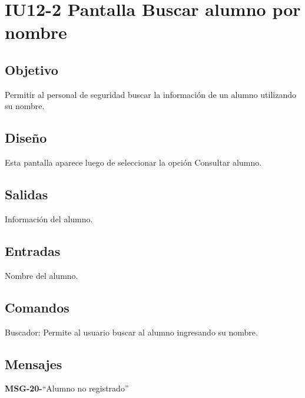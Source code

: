 \section{IU12-2 Pantalla Buscar alumno por nombre}

\subsection{Objetivo}
Permitir al personal de seguridad buscar la información de un alumno utilizando su nombre. 

\subsection{Diseño}
Esta pantalla  aparece luego de seleccionar la opción Consultar alumno. 


\subsection{Salidas}
Información del alumno.

\subsection{Entradas}
Nombre del alumno. 

\subsection{Comandos}
Buscador: Permite al usuario buscar al alumno ingresando su nombre. 

\subsection{Mensajes}

\begin{Citemize}
	\item {\bf MSG-20-}{``Alumno no registrado''}
\end{Citemize}


